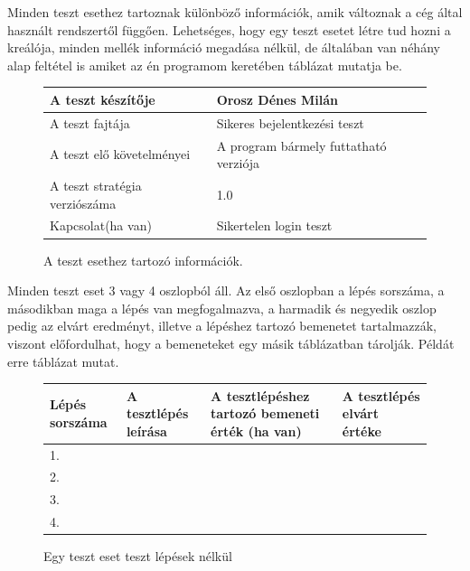 Minden teszt esethez tartoznak különböző információk, amik változnak a cég által használt rendszertől függően. Lehetséges, hogy egy teszt esetet létre tud hozni a kreálója, minden mellék információ megadása nélkül, de általában van néhány alap feltétel is amiket az én programom keretében  táblázat mutatja be.\\

\label {tab:template}
\label {tab:testcase}
\label {tab:successcase}
\label {tab:addnode}
\label {tab:jtree}
\label {tab:ekvivalencia}
\label {tab:kombináció}

\label {tab:console}
\label {tab:modify}
\label {tab:program}
\label {tab:tree}
\label {tab:login}

\begin{figure} [h]
	\begin{center}
		\begin{tabular}{ | p{6cm} | p{6cm}| } 
			\hline
			A teszt készítője & Orosz Dénes Milán  \\ 
			\hline
			A teszt fajtája & Sikeres bejelentkezési teszt  \\ 
			\hline
			A teszt elő követelményei & A program bármely futtatható verziója  \\ 
			\hline
			A teszt stratégia verziószáma & 1.0 \\
			\hline
			Kapcsolat(ha van) & Sikertelen login teszt \\
			\hline
		\end{tabular}
	\end{center}
\label{fig:template}
\caption{A teszt esethez tartozó információk.}
\end{figure}
Minden teszt eset 3 vagy 4 oszlopból áll. Az első oszlopban a lépés sorszáma, a másodikban  maga a lépés van megfogalmazva, a harmadik és negyedik oszlop pedig az elvárt eredményt, illetve a lépéshez tartozó bemenetet tartalmazzák, viszont előfordulhat, hogy a bemeneteket egy másik táblázatban tárolják. Példát erre   táblázat mutat.\\

\begin{figure}[h]
\begin{center}
	\resizebox{\textwidth}{!} {
\begin{tabular}{ |p{3cm}|p{5cm}|p{5cm}|p{5cm}|} 
	\hline
	 Lépés sorszáma & A tesztlépés leírása & A tesztlépéshez tartozó bemeneti érték (ha van) & A tesztlépés elvárt értéke  \\ 
	\hline
	1. & & &  \\ 
	\hline
	2. & & &  \\ 
	\hline
	3. & & & \\
	\hline
	4. & & & \\
	\hline
\end{tabular}
}
\end{center}
	\caption{Egy teszt eset teszt lépések nélkül}
	\label{fig:testcase}
\end{figure}


